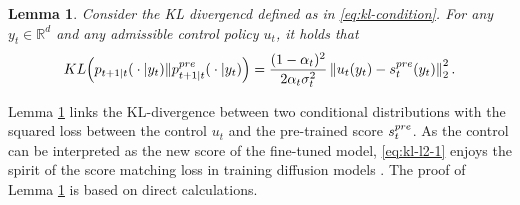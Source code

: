 \documentclass[10pt,a4paper]{amsart}
\newtheorem{Lemma}[Theorem]{Lemma}
\newcommand{\R}{\mathbb{R}}
\newcommand{\norm}[1]{\left \|#1\right \|}
\begin{document}
%
  \begin{Lemma} \label{lemma:kl-l2} 
  Consider the KL divergencd defined as in \eqref{eq:kl-condition}.
  For any $y_t \in \R^d$ and any admissible control policy $u_t$, it holds that
      \begin{align}\label{eq:kl-l2-1}
        {\rm KL}\Big(p_{t+1\vert t}({}\cdot{}\vert y_t) \|p_{t+1\vert t}^{\rm pre}({}\cdot{}\vert y_t)\Big) = \frac{(1 - \alpha_{t})^{2}}{2\alpha_{t}\sigma_{t}^{2}}\norm{u_{t}(y_t) - s^{\rm pre}_{t}(y_{t})}_{2}^{2}.
    \end{align}
  \end{Lemma}
    
  Lemma \ref{lemma:kl-l2} links the KL-divergence between two conditional distributions with the squared loss between the control $u_t$ and the pre-trained score $s_t^{\rm pre}$. As the control can be interpreted as the new score of the fine-tuned model, \eqref{eq:kl-l2-1} enjoys the spirit of the score matching loss in training diffusion models \cite{Ho20,song2020score,han2024neural}. The proof of Lemma \ref{lemma:kl-l2} is based on direct calculations.
\end{document}
